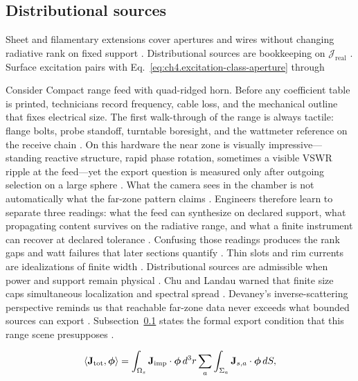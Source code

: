 \subsection{Distributional sources}
\label{sec:ch413}
Sheet and filamentary extensions cover apertures and wires without changing radiative rank on fixed support \cite{stratton1941}. Distributional sources are bookkeeping on $\mathcal{J}_{\mathrm{real}}$ \cite{devaney2004}.
\medskip
Surface excitation pairs with Eq.~\eqref{eq:ch4.excitation-class-aperture} through
\begin{physicalvignette}
Consider Compact range feed with quad-ridged horn. Before any coefficient table is printed, technicians record frequency, cable loss, and the mechanical outline that fixes electrical size. The first walk-through of the range is always tactile: flange bolts, probe standoff, turntable boresight, and the wattmeter reference on the receive chain \cite{hansen1988}.
On this hardware the near zone is visually impressive---standing reactive structure, rapid phase rotation, sometimes a visible VSWR ripple at the feed---yet the export question is measured only after outgoing selection on a large sphere \cite{harrington2001}. What the camera sees in the chamber is not automatically what the far-zone pattern claims \cite{stratton1941}.
Engineers therefore learn to separate three readings: what the feed can synthesize on declared support, what propagating content survives on the radiative range, and what a finite instrument can recover at declared tolerance \cite{devaney2004}. Confusing those readings produces the rank gaps and watt failures that later sections quantify \cite{pal2026}.
Thin slots and rim currents are idealizations of finite width . Distributional sources are admissible when power and support remain physical .
Chu and Landau warned that finite size caps simultaneous localization and spectral spread \cite{chu1948}. Devaney's inverse-scattering perspective reminds us that reachable far-zone data never exceeds what bounded sources can export \cite{devaney2004}.
Subsection~\ref{sec:ch413} states the formal export condition that this range scene presupposes \cite{stratton1941}.
\end{physicalvignette}
\begin{equation}
\label{eq:ch4.surface-source-embedding}
\langle\mathbf{J}_{\mathrm{tot}},\boldsymbol{\phi}\rangle
=
\int_{\Omega_{s}}\mathbf{J}_{\mathrm{imp}}\cdot\boldsymbol{\phi}\,d^{3}r
\sum_{a}\int_{\Sigma_{a}}\mathbf{J}_{s,a}\cdot\boldsymbol{\phi}\,dS,
\end{equation}
